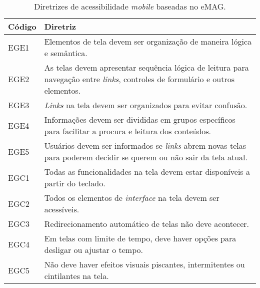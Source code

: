 \begin{table}[htb]
  \begin{center}
    \ABNTEXfontereduzida
    \caption{Diretrizes de acessibilidade \emph{mobile} baseadas no eMAG.}
    \label{tab-dir-acc-mob-1}
    \begin{tabular}{p{1.0cm}|p{13.0cm}}
      \textbf{Código} & \textbf{Diretriz}                                                                                                                            \\
      \hline
      EGE1            & Elementos de tela devem ser organização de maneira lógica e semântica.                                                                       \\
      \hline
      EGE2            & As telas devem apresentar sequência lógica de leitura para navegação entre \emph{links}, controles de formulário e outros elementos.         \\
      \hline
      EGE3            & \emph{Links} na tela devem ser organizados para evitar confusão.                                                                             \\
      \hline
      EGE4            & Informações devem ser divididas em grupos específicos para facilitar a procura e leitura dos conteúdos.                                      \\
      \hline
      EGE5            & Usuários devem ser informados se \emph{links} abrem novas telas para poderem decidir se querem ou não sair da tela atual.                    \\
      \hline
      EGC1            & Todas as funcionalidades na tela devem estar disponíveis a partir do teclado.                                                                \\
      \hline
      EGC2            & Todos os elementos de \emph{interface} na tela devem ser acessíveis.                                                                         \\
      \hline
      EGC3            & Redirecionamento automático de telas não deve acontecer.                                                                                     \\
      \hline
      EGC4            & Em telas com limite de tempo, deve haver opções para desligar ou ajustar o tempo.                                                            \\
      \hline
      EGC5            & Não deve haver efeitos visuais piscantes, intermitentes ou cintilantes na tela.                                                              \\

\end{tabular}
\end{center}
\end{table}
